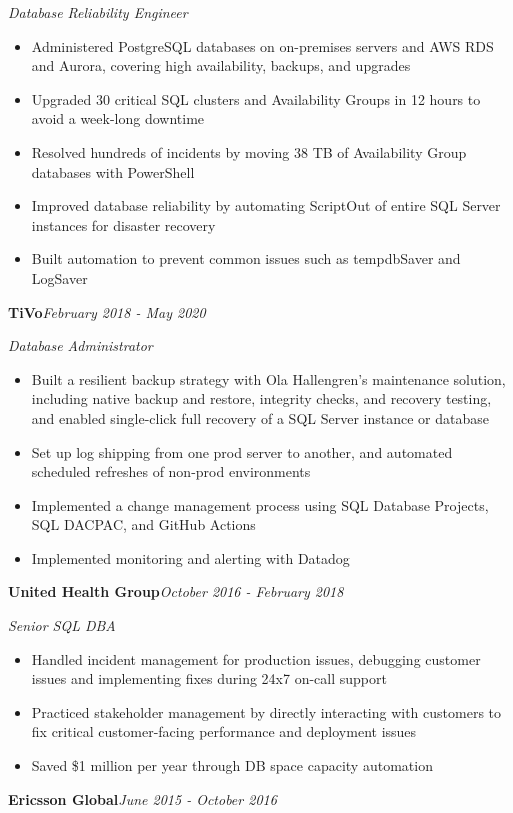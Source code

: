 \documentclass[10pt,a4paper]{article}
\begin{document}
\textit{Database Reliability Engineer}\\[-5pt]
\begin{itemize}
  \item Administered PostgreSQL databases on on-premises servers and AWS RDS and Aurora, covering high availability, backups, and upgrades
  \item Upgraded 30 critical SQL clusters and Availability Groups in 12 hours to avoid a week-long downtime
  \item Resolved hundreds of incidents by moving 38 TB of Availability Group databases with PowerShell
  \item Improved database reliability by automating ScriptOut of entire SQL Server instances for disaster recovery
  \item Built automation to prevent common issues such as tempdbSaver and LogSaver
\end{itemize}
\vspace{14.7pt}
\noindent\textbf{TiVo}\hfill \textit{February 2018 - May 2020}

\textit{Database Administrator}\\[-5pt]
\begin{itemize}
  \item Built a resilient backup strategy with Ola Hallengren's maintenance solution, including native backup and restore, integrity checks, and recovery testing, and enabled single-click full recovery of a SQL Server instance or database
  \item Set up log shipping from one prod server to another, and automated scheduled refreshes of non-prod environments
  \item Implemented a change management process using SQL Database Projects, SQL DACPAC, and GitHub Actions
  \item Implemented monitoring and alerting with Datadog
\end{itemize}
\vspace{14.7pt}
\noindent\textbf{United Health Group}\hfill \textit{October 2016 - February 2018}

\textit{Senior SQL DBA}\\[-5pt]
\begin{itemize}
  \item Handled incident management for production issues, debugging customer issues and implementing fixes during 24x7 on-call support
  \item Practiced stakeholder management by directly interacting with customers to fix critical customer-facing performance and deployment issues
  \item Saved \$1 million per year through DB space capacity automation
\end{itemize}
\vspace{14.7pt}
\noindent\textbf{Ericsson Global}\hfill \textit{June 2015 - October 2016}
\end{document}
